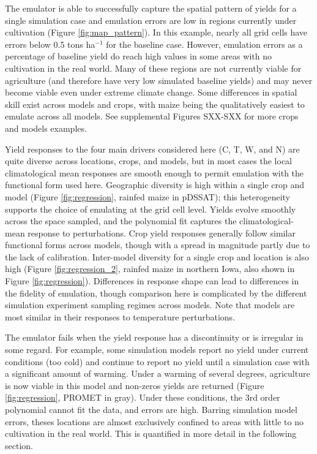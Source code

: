 \documentclass[gmd, manuscript]{copernicus} %
\begin{document}
The emulator is able to successfully capture the spatial pattern of yields for a single simulation case and emulation errors are low in regions currently under cultivation (Figure \ref{fig:map_pattern}). 
In this example, nearly all grid cells have errors below 0.5 tons ha$^{-1}$ for the baseline case. 
However, emulation errors as a percentage of baseline yield do reach high values in some areas with no cultivation in the real world.
Many of these regions are not currently viable for agriculture (and therefore have very low simulated baseline yields) and may never become viable even under extreme climate change.  
Some differences in spatial skill exist across models and crops, with maize being the qualitatively easiest to emulate across all models.  
See supplemental Figures SXX-SXX for more crops and models examples. 

Yield responses to the four main drivers considered here (C, T, W, and N) are quite diverse across locations, crops, and models, but in most cases the local climatological mean responses are smooth enough to permit emulation with the functional form used here.
Geographic diversity is high within a single crop and model (Figure \ref{fig:regression}, rainfed maize in pDSSAT); this heterogeneity supports the choice of emulating at the grid cell level. 
Yields evolve smoothly across the space sampled, and the polynomial fit captures the climatological-mean response to perturbations. 
Crop yield responses generally follow similar functional forms across models, though with a spread in magnitude partly due to the lack of calibration. 
Inter-model diversity for a single crop and location is also high (Figure \ref{fig:regression_2}, rainfed maize in northern Iowa, also shown in Figure \ref{fig:regression}). 
Differences in response shape can lead to  differences in the fidelity of emulation, though comparison here is complicated by the different simulation experiment sampling regimes across models. 
Note that models are most similar in their responses to temperature perturbations. 

The emulator fails when the yield response has a discontinuity or is irregular in some regard. 
For example, some simulation models report no yield under current conditions (too cold) and continue to report no yield until a simulation case with a significant amount of warming. 
Under a warming of several degrees, agriculture is now viable in this model and non-zeros yields are returned (Figure \ref{fig:regression}, PROMET in gray). 
Under these conditions, the 3rd order polynomial cannot fit the data, and errors are high. 
Barring simulation model errors, theses locations are almost exclusively confined to areas with little to no cultivation in the real world. 
This is quantified in more detail in the following section.
\end{document}
